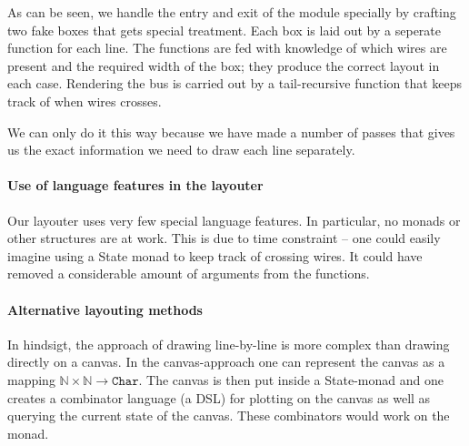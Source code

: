 As can be seen, we handle the entry and exit of the module specially
by crafting two fake boxes that gets special treatment. Each box is
laid out by a seperate function for each line. The functions are fed
with knowledge of which wires are present and the required width of
the box; they produce the correct layout in each case. Rendering the
bus is carried out by a tail-recursive function that keeps track of
when wires crosses.

We can only do it this way because we have made a number of passes
that gives us the exact information we need to draw each line
separately.

\paragraph{Use of language features in the layouter}
\label{sec:use-lang-feat}

Our layouter uses very few special language features. In particular,
no monads or other structures are at work. This is due to time
constraint -- one could easily imagine using a State monad to keep
track of crossing wires. It could have removed a considerable amount
of arguments from the functions.

\paragraph{Alternative layouting methods}
\label{sec:altern-layo-meth}

In hindsigt, the approach of drawing line-by-line is more complex than
drawing directly on a canvas. In the canvas-approach one can represent
the canvas as a mapping $\mathbb{N} \times \mathbb{N} \to
\texttt{Char}$. The canvas is then put inside a State-monad and one
creates a combinator language (a DSL) for plotting on the canvas as
well as querying the current state of the canvas. These combinators
would work on the monad.

